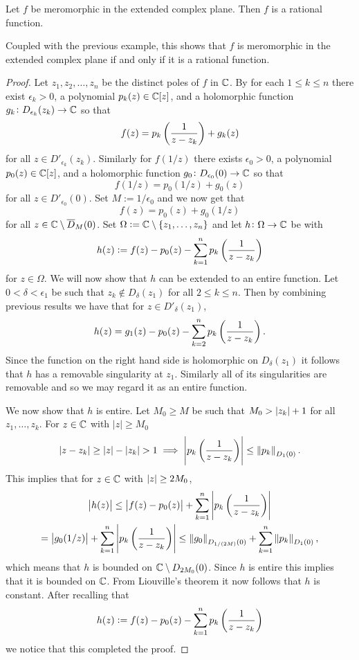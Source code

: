 \documentclass[11pt,a4paper]{article}
\begin{document}
\begin{proposition}
  Let $f$ be meromorphic in the extended complex plane.
  Then $f$ is a rational function.
\end{proposition}
\begin{remark}
  Coupled with the previous example,
  this shows that $f$ is meromorphic in the extended complex plane if
  and only if it is a rational function.
\end{remark}
\begin{proof}
  Let $z_1,z_2,\dots,z_n$ be the distinct poles of $f$ in $\mathbb{C}$.
  By  for each $1 \le k \le n$ there exist
  $\epsilon_k > 0$, a polynomial $p_k(z) \in \mathbb{C}[z]$, and a holomorphic function
  $g_k \colon D_{\epsilon_k}(z_k) \to \mathbb{C}$ so that
  \[
    f(z) = p_k \del{\frac{1}{z - z_k}} + g_k(z)
  \]
  for all $z \in D'_{\epsilon_k}(z_k)$.
  Similarly for $f(1/z)$ there exists $\epsilon_0 > 0$,
  a polynomial $p_0(z) \in \mathbb{C}[z]$, and a holomorphic function
  $g_0 \colon D_{\epsilon_0}(0) \to \mathbb{C}$ so that
  \[
    f(1/z) = p_0(1/z) + g_0(z)
  \]
  for all $z \in D'_{\epsilon_0}(0)$.
  Set $M := 1/\epsilon_0$ and we now get that
  \[
    f(z) = p_0(z) + g_0(1/z)
  \]
  for all $z \in \mathbb{C} \setminus \overline D_{M}(0)$.
  Set $\Omega := \mathbb{C} \setminus \left\{z_1,\dots,z_n\right\}$
  and let $h \colon \Omega \to \mathbb{C}$ be with
  \[
    h(z) := f(z) - p_0(z) - \sum_{k=1}^{n} p_k \del{\frac{1}{z - z_k}}
  \]
  for $z \in \Omega$.
  We will now show that $h$ can be extended to an entire function.
  Let $0 < \delta < \epsilon_1$ be such that $z_k \notin D_{\delta}(z_1)$
  for all $2 \le k \le n$.
  Then by combining previous results we have that for $z \in D'_{\delta}(z_1)$,
  \[
    h(z) = g_1(z) - p_0(z) - \sum_{k=2}^{n} p_k \del{\frac{1}{z - z_k}}.
  \]
  Since the function on the right hand side is holomorphic on $D_{\delta}(z_1)$
  it follows that $h$ has a removable singularity at $z_1$.
  Similarly all of its singularities are removable and so we may regard
  it as an entire function.

  We now show that $h$ is entire.
  Let $M_0 \geq M$ be such that $M_0 > \left\lvert z_k\right\rvert + 1$ for all $z_1,\dots,z_k$.
  For $z \in \mathbb{C}$ with $|z| \geq M_0$
  \[
    \abs{z - z_k} \geq \abs{z} - \abs{z_k} > 1 \implies
    \abs{p_k\del{\frac{1}{z - z_k}}} \le \norm{p_k}_{D_1(0)}.
  \]
  This implies that for $z \in \mathbb{C}$ with $\left\lvert z\right\rvert \geq 2 M_0$,
  \begin{multline*}
    \abs{h(z)} \le
    \abs{f(z) - p_0(z)} + \sum_{k=1}^{n} \abs{p_k\del{\frac{1}{z - z_k}}} \\ =
    \abs{g_0(1/z)} + \sum_{k=1}^{n} \abs{p_k\del{\frac{1}{z - z_k}}} \le
    \norm{g_0}_{D_{1/(2M)}(0)} + \sum_{k=1}^{n} \norm{p_k}_{D_1(0)},
  \end{multline*}
  which means that $h$ is bounded on $\mathbb{C} \setminus D_{2 M_0}(0)$.
  Since $h$ is entire this implies that it is bounded on $\mathbb{C}$.
  From Liouville's theorem it now follows that $h$ is constant.
  After recalling that
  \[
    h(z) := f(z) - p_0(z) - \sum_{k=1}^{n} p_k \del{\frac{1}{z - z_k}}
  \]
  we notice that this completed the proof.
\end{proof}
\end{document}
